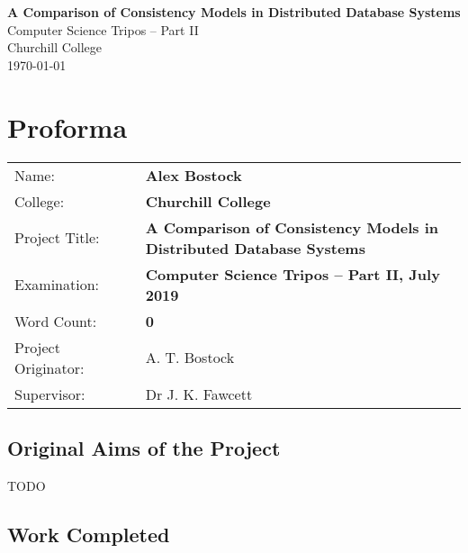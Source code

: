 \documentclass[12pt,a4paper,twoside,openright]{report}
\begin{document}





\pagestyle{empty}


\vspace*{60mm}
\begin{center}
\Huge
\textbf{A Comparison of Consistency Models in Distributed Database Systems} \\[5mm]
Computer Science Tripos -- Part II \\[5mm]
Churchill College \\[5mm]
\today  %
\end{center}


\pagestyle{plain}

\chapter*{Proforma}

{\large
\begin{tabular}{ll}
Name:               & \bf Alex Bostock                          \\
College:            & \bf Churchill College                     \\
Project Title:      & \makecell[tl]{\bf A Comparison of Consistency Models in \\ \bf Distributed Database Systems}\\
Examination:        & \bf Computer Science Tripos -- Part II, July 2019  \\
Word Count:         & \bf 0  \\
Project Originator: & A. T. Bostock                    \\
Supervisor:         & Dr J. K. Fawcett                    \\ 
\end{tabular}
}


\section*{Original Aims of the Project}

TODO

\section*{Work Completed}
\end{document}
